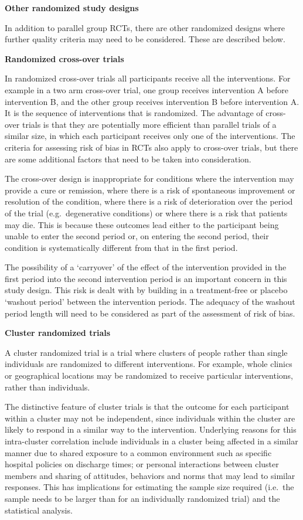 \documentclass[
  10pt,
  a4paper,
  DIV=11,
  numbers=noendperiod]{scrreprt}
\begin{document}
\textbf{Other randomized study designs}

In addition to parallel group RCTs, there are other randomized designs
where further quality criteria may need to be considered. These are
described below.

\textbf{Randomized cross-over trials}

In randomized cross-over trials all participants receive all the
interventions. For example in a two arm cross-over trial, one group
receives intervention A before intervention B, and the other group
receives intervention B before intervention A. It is the sequence of
interventions that is randomized. The advantage of cross-over trials is
that they are potentially more efficient than parallel trials of a
similar size, in which each participant receives only one of the
interventions. The criteria for assessing risk of bias in RCTs also
apply to cross-over trials, but there are some additional factors that
need to be taken into consideration.

The cross-over design is inappropriate for conditions where the
intervention may provide a cure or remission, where there is a risk of
spontaneous improvement or resolution of the condition, where there is a
risk of deterioration over the period of the trial (e.g.~degenerative
conditions) or where there is a risk that patients may die. This is
because these outcomes lead either to the participant being unable to
enter the second period or, on entering the second period, their
condition is systematically different from that in the first period.

The possibility of a `carryover' of the effect of the intervention
provided in the first period into the second intervention period is an
important concern in this study design. This risk is dealt with by
building in a treatment-free or placebo `washout period' between the
intervention periods. The adequacy of the washout period length will
need to be considered as part of the assessment of risk of bias.

\textbf{Cluster randomized trials}

A cluster randomized trial is a trial where clusters of people rather
than single individuals are randomized to different interventions. For
example, whole clinics or geographical locations may be randomized to
receive particular interventions, rather than individuals.

The distinctive feature of cluster trials is that the outcome for each
participant within a cluster may not be independent, since individuals
within the cluster are likely to respond in a similar way to the
intervention. Underlying reasons for this intra-cluster correlation
include individuals in a cluster being affected in a similar manner due
to shared exposure to a common environment such as specific hospital
policies on discharge times; or personal interactions between cluster
members and sharing of attitudes, behaviors and norms that may lead to
similar responses. This has implications for estimating the sample size
required (i.e.~the sample needs to be larger than for an individually
randomized trial) and the statistical analysis.
\end{document}
